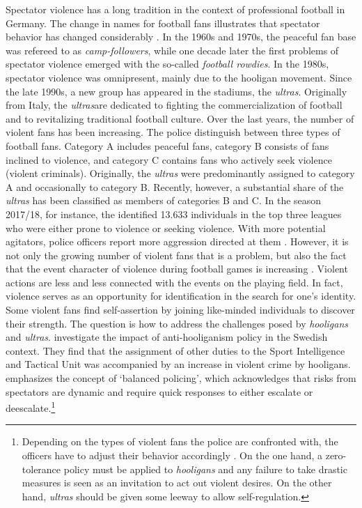 Spectator violence has a long tradition in the context of professional football in Germany. The change in names for football fans illustrates that spectator behavior has changed considerably \citep{pilz2005kuttenfan}. In the 1960s and 1970s, the peaceful fan base was refereed to as \textit{camp-followers}, while one decade later the first problems of spectator violence emerged with the so-called \textit{football rowdies}. In the 1980s, spectator violence was omnipresent, mainly due to the hooligan movement. Since the late 1990s, a new group has appeared in the stadiums, the \textit{ultras}. Originally from Italy, the \textit{ultras}are dedicated to fighting the commercialization of football and to revitalizing traditional football culture. Over the last years, the number of violent fans has been increasing. The police distinguish between three types of football fans. Category A includes peaceful fans, category B consists of fans inclined to violence, and category C contains fans who actively seek violence (violent criminals). Originally, the \textit{ultras} were predominantly assigned to category A and occasionally to category B. Recently, however, a substantial share of the \textit{ultras} has been classified as members of categories B and C. In the season 2017/18, for instance, the \cite{zis17_18} identified 13.633 individuals in the top three leagues who were either prone to violence or seeking violence. With more potential agitators, police officers report more aggression directed at them \citep{feltes2010fussballgewalt}. However, it is not only the growing number of violent fans that is a problem, but also the fact that the event character of violence during football games is increasing \citep{pilz2005kuttenfan}. Violent actions are less and less connected with the events on the playing field. In fact, violence serves as an opportunity for identification in the search for one's identity. Some violent fans find self-assertion by joining like-minded individuals to discover their strength. The question is how to address the challenges posed by \textit{hooligans} and \textit{ultras}. \cite{poutvaara2009police} investigate the impact of anti-hooliganism policy in the Swedish context. They find that the assignment of other duties to the Sport Intelligence and Tactical Unit was accompanied by an increase in violent crime by hooligans. \cite{feltes2010fussballgewalt} emphasizes the concept of `balanced policing', which acknowledges that risks from spectators are dynamic and require quick responses to either escalate or deescalate.\footnote{Depending on the types of violent fans the police are confronted with, the officers have to adjust their behavior accordingly \citep{feltes2010fussballgewalt}. On the one hand, a zero-tolerance policy must be applied to \textit{hooligans} and any failure to take drastic measures is seen as an invitation to act out violent desires. On the other hand, \textit{ultras} should be given some leeway to allow self-regulation.} 



